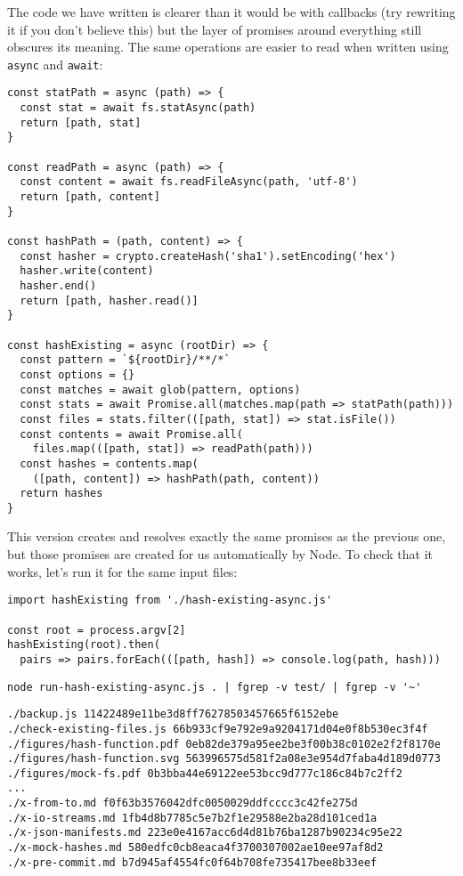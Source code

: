\documentclass[krantzl]{krantz}
\begin{document}
The code we have written is clearer than it would be with callbacks
(try rewriting it if you don’t believe this)
but the layer of promises around everything still obscures its meaning.
The same operations are easier to read when written using \texttt{async} and \texttt{await}:


\begin{lstlisting}[frame=tblr]
const statPath = async (path) => {
  const stat = await fs.statAsync(path)
  return [path, stat]
}

const readPath = async (path) => {
  const content = await fs.readFileAsync(path, 'utf-8')
  return [path, content]
}

const hashPath = (path, content) => {
  const hasher = crypto.createHash('sha1').setEncoding('hex')
  hasher.write(content)
  hasher.end()
  return [path, hasher.read()]
}

const hashExisting = async (rootDir) => {
  const pattern = `${rootDir}/**/*`
  const options = {}
  const matches = await glob(pattern, options)
  const stats = await Promise.all(matches.map(path => statPath(path)))
  const files = stats.filter(([path, stat]) => stat.isFile())
  const contents = await Promise.all(
    files.map(([path, stat]) => readPath(path)))
  const hashes = contents.map(
    ([path, content]) => hashPath(path, content))
  return hashes
}
\end{lstlisting}



\noindent This version creates and resolves exactly the same promises as the previous one,
but those promises are created for us automatically by Node.
To check that it works,
let’s run it for the same input files:


\begin{lstlisting}[frame=tblr]
import hashExisting from './hash-existing-async.js'

const root = process.argv[2]
hashExisting(root).then(
  pairs => pairs.forEach(([path, hash]) => console.log(path, hash)))
\end{lstlisting}



\begin{lstlisting}[frame=shadowbox]
node run-hash-existing-async.js . | fgrep -v test/ | fgrep -v '~'
\end{lstlisting}



\begin{lstlisting}[frame=tblr,backgroundcolor=\color{black!5}]
./backup.js 11422489e11be3d8ff76278503457665f6152ebe
./check-existing-files.js 66b933cf9e792e9a9204171d04e0f8b530ec3f4f
./figures/hash-function.pdf 0eb82de379a95ee2be3f00b38c0102e2f2f8170e
./figures/hash-function.svg 563996575d581f2a08e3e954d7faba4d189d0773
./figures/mock-fs.pdf 0b3bba44e69122ee53bcc9d777c186c84b7c2ff2
...
./x-from-to.md f0f63b3576042dfc0050029ddfcccc3c42fe275d
./x-io-streams.md 1fb4d8b7785c5e7b2f1e29588e2ba28d101ced1a
./x-json-manifests.md 223e0e4167acc6d4d81b76ba1287b90234c95e22
./x-mock-hashes.md 580edfc0cb8eaca4f3700307002ae10ee97af8d2
./x-pre-commit.md b7d945af4554fc0f64b708fe735417bee8b33eef
\end{lstlisting}
\end{document}
